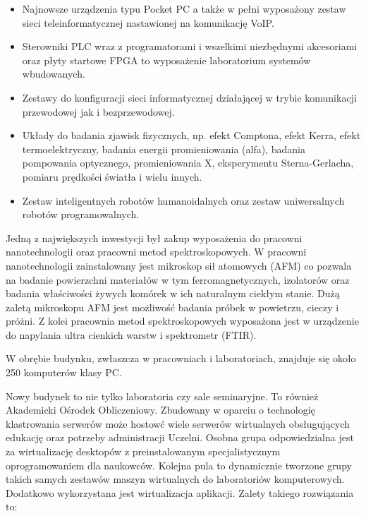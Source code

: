 \documentclass[a4paper,12pt]{article}
\begin{document}
\begin{itemize}
\item Najnowsze urządzenia typu Pocket PC a także w pełni wyposażony zestaw sieci teleinformatycznej
nastawionej na komunikację VoIP.
\item Sterowniki PLC wraz z programatorami i wszelkimi niezbędnymi akcesoriami oraz płyty startowe FPGA
to wyposażenie laboratorium systemów wbudowanych.
\item Zestawy do konfiguracji sieci informatycznej działającej w trybie komunikacji przewodowej jak i bezprzewodowej.
\item Układy do badania zjawisk fizycznych, np. efekt Comptona, efekt Kerra, efekt termoelektryczny, badania energii promieniowania (alfa), badania pompowania optycznego, promieniowania X, eksperymentu Sterna-Gerlacha, pomiaru prędkości światła i wielu innych.
\item Zestaw inteligentnych robotów humanoidalnych oraz zestaw uniwersalnych robotów programowalnych.
\end{itemize}

{}Jedną z największych inwestycji był zakup wyposażenia do pracowni nanotechnologii oraz pracowni metod
spektroskopowych. W pracowni nanotechnologii zainstalowany jest mikroskop sił atomowych (AFM) co
pozwala na badanie powierzchni materiałów w tym ferromagnetycznych, izolatorów oraz badania właściwości
żywych komórek w ich naturalnym ciekłym stanie. Dużą zaletą mikroskopu AFM jest możliwość badania
próbek w powietrzu, cieczy i próżni. Z kolei pracownia metod spektroskopowych wyposażona jest w
urządzenie do napylania ultra cienkich warstw i spektrometr (FTIR).

{}W obrębie budynku, zwłaszcza w pracowniach i laboratoriach, znajduje się około 250 komputerów klasy PC.

{}Nowy budynek to nie tylko laboratoria czy sale seminaryjne. To również Akademicki Ośrodek Obliczeniowy. Zbudowany w oparciu o technologię klastrowania serwerów może hostowć wiele serwerów wirtualnych obsługujących edukację oraz potrzeby administracji Uczelni. Osobna grupa odpowiedzialna jest za wirtualizację desktopów z preinstalowanym specjalistycznym oprogramowaniem dla naukowców. Kolejna pula to dynamicznie tworzone grupy takich samych zestawów maszyn wirtualnych do laboratoriów komputerowych. Dodatkowo wykorzystana jest wirtualizacja aplikacji. Zalety takiego rozwiązania to:
\end{document}
